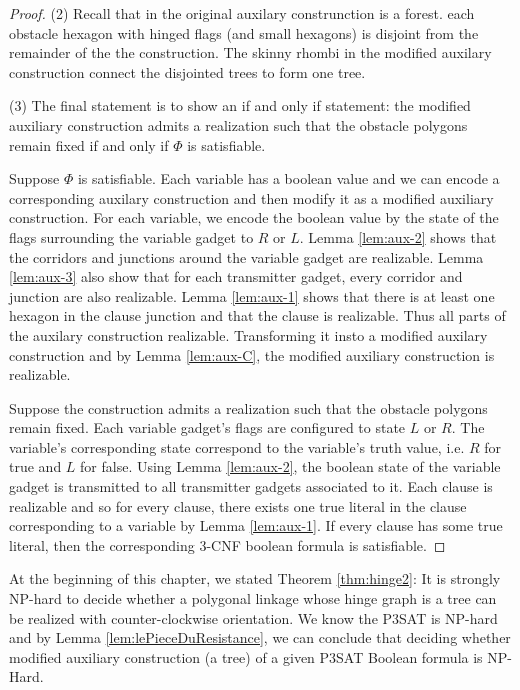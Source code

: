 \begin{proof}
\noindent (2) Recall that in the original auxilary construnction is a forest.
each obstacle hexagon with hinged flags (and small hexagons) is disjoint from the remainder of the the construction. 
The skinny rhombi in the modified auxilary construction connect the disjointed trees to form one tree.

\noindent (3) The final statement is to show an if and only if statement: the modified auxiliary construction admits a realization such that the obstacle polygons remain fixed if and only if $\Phi$ is satisfiable.

Suppose $\Phi$ is satisfiable.  %
Each variable has a boolean value and we can encode a corresponding auxilary construction and then modify it as a modified auxiliary construction.
For each variable, we encode the boolean value by the state of the flags surrounding the variable gadget to $R$ or $L$.  
Lemma \ref{lem:aux-2} shows that the corridors and junctions around the variable gadget are realizable.
Lemma \ref{lem:aux-3} also show that for each transmitter gadget, every corridor and junction are also realizable. 
Lemma \ref{lem:aux-1} shows that there is at least one hexagon in the clause junction and that the clause is realizable.
Thus all parts of the auxilary construction realizable.  
Transforming it insto a modified auxilary construction and by Lemma \ref{lem:aux-C}, the modified auxiliary construction is realizable.

Suppose the construction admits a realization such that the obstacle polygons remain fixed.
Each variable gadget's flags are configured to state $L$ or $R$. 
The variable's corresponding state correspond to the variable's truth value, i.e. $R$ for true and $L$ for false.
Using Lemma \ref{lem:aux-2}, the boolean state of the variable gadget is transmitted to all transmitter gadgets associated to it.
Each clause is realizable and so for every clause, there exists one true literal in the clause corresponding to a variable by Lemma \ref{lem:aux-1}. 
If every clause has some true literal, then the corresponding 3-CNF boolean formula is satisfiable.
\end{proof}

At the beginning of this chapter, we stated Theorem \ref{thm:hinge2}: It is strongly NP-hard to decide whether a polygonal linkage whose hinge graph is a tree can be realized with counter-clockwise orientation.  
We know the P3SAT is NP-hard \cite{lichtenstein1982planar} and by Lemma \ref{lem:lePieceDuResistance}, we can conclude that deciding whether modified auxiliary construction (a tree) of a given P3SAT Boolean formula is NP-Hard.

